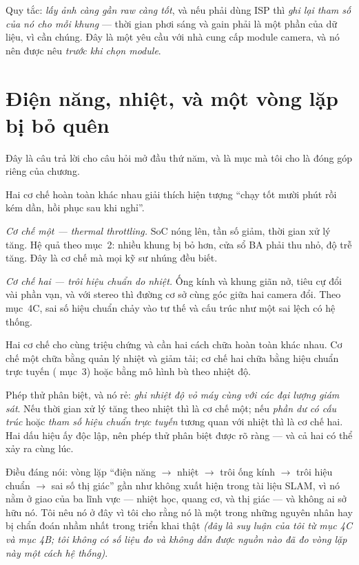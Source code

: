 \documentclass[../../vslam.tex]{subfiles}
\begin{document}
Quy tắc: \emph{lấy ảnh càng gần raw càng tốt}, và nếu phải dùng ISP thì \emph{ghi lại tham số của nó cho mỗi khung} --- thời gian phơi sáng và gain phải là một phần của dữ liệu, vì  cần chúng. Đây là một yêu cầu với nhà cung cấp module camera, và nó nên được nêu \emph{trước khi chọn module}.

\section{Điện năng, nhiệt, và một vòng lặp bị bỏ quên}

Đây là câu trả lời cho câu hỏi mở đầu thứ năm, và là mục mà tôi cho là đóng góp riêng của chương.

Hai cơ chế hoàn toàn khác nhau giải thích hiện tượng ``chạy tốt mười phút rồi kém dần, hồi phục sau khi nghỉ''.

\emph{Cơ chế một --- thermal throttling.} SoC nóng lên, tần số giảm, thời gian xử lý tăng. Hệ quả theo mục~2: nhiều khung bị bỏ hơn, cửa sổ BA phải thu nhỏ, độ trễ tăng. Đây là cơ chế mà mọi kỹ sư nhúng đều biết.

\emph{Cơ chế hai --- trôi hiệu chuẩn do nhiệt.} Ống kính và khung giãn nở, tiêu cự đổi vài phần vạn, và với stereo thì đường cơ sở cùng góc giữa hai camera đổi. Theo  mục~4C, sai số hiệu chuẩn chảy vào tư thế và cấu trúc như một sai lệch có hệ thống.

Hai cơ chế cho cùng triệu chứng và cần hai cách chữa hoàn toàn khác nhau. Cơ chế một chữa bằng quản lý nhiệt và giảm tải; cơ chế hai chữa bằng hiệu chuẩn trực tuyến ( mục~3) hoặc bằng mô hình bù theo nhiệt độ.

Phép thử phân biệt, và nó rẻ: \emph{ghi nhiệt độ vỏ máy cùng với các đại lượng giám sát}. Nếu thời gian xử lý tăng theo nhiệt thì là cơ chế một; nếu \emph{phần dư có cấu trúc} hoặc \emph{tham số hiệu chuẩn trực tuyến} tương quan với nhiệt thì là cơ chế hai. Hai dấu hiệu ấy độc lập, nên phép thử phân biệt được rõ ràng --- và cả hai có thể xảy ra cùng lúc.

Điều đáng nói: vòng lặp ``điện năng \(\rightarrow\) nhiệt \(\rightarrow\) trôi ống kính \(\rightarrow\) trôi hiệu chuẩn \(\rightarrow\) sai số thị giác'' gần như không xuất hiện trong tài liệu SLAM, vì nó nằm ở giao của ba lĩnh vực --- nhiệt học, quang cơ, và thị giác --- và không ai sở hữu nó. Tôi nêu nó ở đây vì tôi cho rằng nó là một trong những nguyên nhân hay bị chẩn đoán nhầm nhất trong triển khai thật \emph{(đây là suy luận của tôi từ  mục 4C và  mục 4B; tôi không có số liệu đo và không dẫn được nguồn nào đã đo vòng lặp này một cách hệ thống)}.
\end{document}
